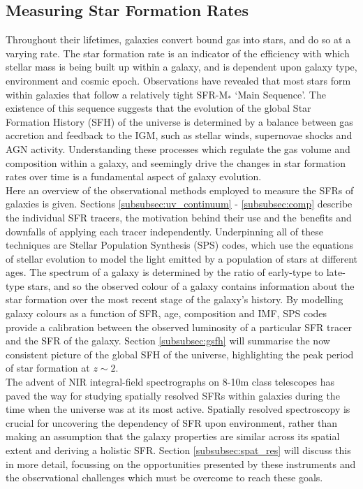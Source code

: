 \documentclass{literature}
\begin{document}
\subsection{Measuring Star Formation Rates}\label{subsec:sfr}
Throughout their lifetimes, galaxies convert bound gas into stars, and do so at a varying rate. The star formation rate is an indicator of the efficiency with which stellar mass is being built up within a galaxy, and is dependent upon galaxy type, environment and cosmic epoch. Observations have revealed that most stars form within galaxies that follow a relatively tight SFR-M$_{*}$ `Main Sequence'. The existence of this sequence suggests that the evolution of the global Star Formation History (SFH) of the universe is determined by a balance between gas accretion and feedback to the IGM, such as stellar winds, supernovae shocks and AGN activity. Understanding these processes which regulate the gas volume and composition within a galaxy, and seemingly drive the changes in star formation rates over time is a fundamental aspect of galaxy evolution. \\ 
Here an overview of the observational methods employed to measure the SFRs of galaxies is given. 
Sections \ref{subsubsec:uv_continuum} - \ref{subsubsec:comp} describe the individual SFR tracers, the motivation behind their use and the benefits and downfalls of applying each tracer independently. Underpinning all of these techniques are Stellar Population Synthesis (SPS) codes, which use the equations of stellar evolution to model the light emitted by a population of stars at different ages. The spectrum of a galaxy is determined by the ratio of early-type to late-type stars, and so the observed colour of a galaxy contains information about the star formation over the most recent stage of the galaxy's history. By modelling galaxy colours as a function of SFR, age, composition and IMF, SPS codes provide a calibration between the observed luminosity of a particular SFR tracer and the SFR of the galaxy. Section \ref{subsubsec:gsfh} will summarise the now consistent picture of the global SFH of the universe, highlighting the peak period of star formation at $z \sim 2$.  \\ 

The advent of NIR integral-field spectrographs on 8-10m class telescopes has paved the way for studying spatially resolved SFRs within galaxies during the time when the universe was at its most active. Spatially resolved spectroscopy is crucial for uncovering the dependency of SFR upon environment, rather than making an assumption that the galaxy properties are similar across its spatial extent and deriving a holistic SFR. Section \ref{subsubsec:spat_res} will discuss this in more detail, focussing on the opportunities presented by these instruments and the observational challenges which must be overcome to reach these goals.     
\end{document}
